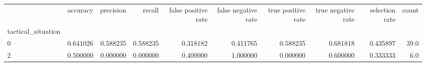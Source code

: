 \begin{tabular}{lrrrrrrrrr}
\toprule
{} &  accuracy &  precision &    recall &  false positive rate &  false negative rate &  true positive rate &  true negative rate &  selection rate &  count \\
tactical\_situation &           &            &           &                      &                      &                     &                     &                 &        \\
\midrule
0                  &  0.641026 &   0.588235 &  0.588235 &             0.318182 &             0.411765 &            0.588235 &            0.681818 &        0.435897 &   39.0 \\
2                  &  0.500000 &   0.000000 &  0.000000 &             0.400000 &             1.000000 &            0.000000 &            0.600000 &        0.333333 &    6.0 \\
\bottomrule
\end{tabular}
